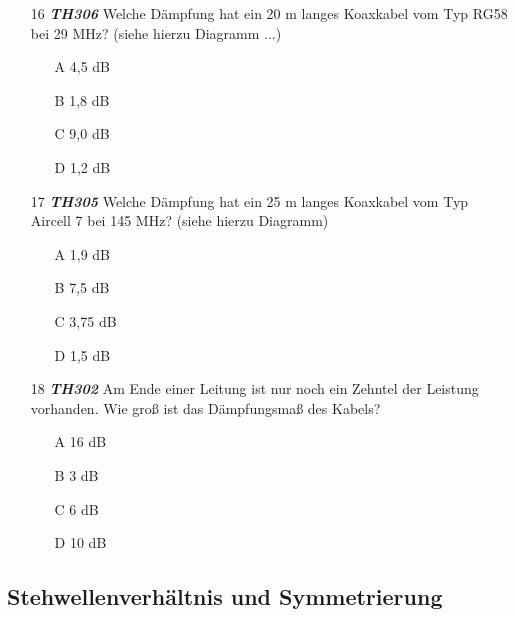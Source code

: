 \begin{enumerate} 
\itemsep1pt\parskip0pt
\item[16] \emph{\textbf{TH306}}  Welche Dämpfung hat ein 20 m langes Koaxkabel vom Typ RG58 bei 29 MHz? (siehe hierzu Diagramm ...)
	\begin{enumerate}
	\itemsep1pt\parskip0pt
		\item[A] 4,5 dB
		\item[B] 1,8 dB
		\item[C] 9,0 dB
		\item[D] 1,2 dB
	\end{enumerate}
\item[17] \emph{\textbf{TH305}}  Welche Dämpfung hat ein 25 m langes Koaxkabel vom Typ Aircell 7 bei 145 MHz? (siehe hierzu Diagramm)
	\begin{enumerate}
	\itemsep1pt\parskip0pt
		\item[A] 1,9 dB
		\item[B] 7,5 dB
		\item[C] 3,75 dB
		\item[D] 1,5 dB
	\end{enumerate}
\item[18] \emph{\textbf{TH302}}  Am Ende einer Leitung ist nur noch ein Zehntel der Leistung vorhanden. Wie groß ist das Dämpfungsmaß des Kabels?
	\begin{enumerate}
	\itemsep1pt\parskip0pt
		\item[A] 16 dB
		\item[B] 3 dB
		\item[C] 6 dB
		\item[D] 10 dB
	\end{enumerate}
\end{enumerate}

\subsection*{Stehwellenverhältnis und Symmetrierung}

